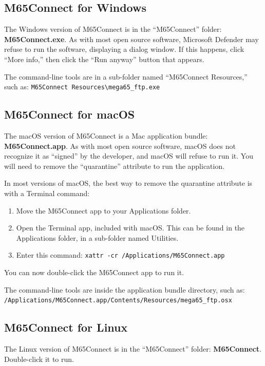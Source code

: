 \subsection{M65Connect for Windows}

The Windows version of M65Connect is in the ``M65Connect'' folder: {\bf M65Connect.exe}. As with most open source software, Microsoft Defender may refuse to run the software, displaying a dialog window. If this happens, click ``More info,'' then click the ``Run anyway'' button that appears.

The command-line tools are in a sub-folder named ``M65Connect Resources,'' such as: {\tt M65Connect Resources\textbackslash{}mega65\_ftp.exe}

\subsection{M65Connect for macOS}

The macOS version of M65Connect is a Mac application bundle: {\bf M65Connect.app}. As with most open source software, macOS does not recognize it as ``signed'' by the developer, and macOS will refuse to run it. You will need to remove the ``quarantine'' attribute to run the application.

In most versions of macOS, the best way to remove the quarantine attribute is with a Terminal command:

\begin{enumerate}
\item Move the M65Connect app to your Applications folder.
\item Open the Terminal app, included with macOS. This can be found in the Applications folder, in a sub-folder named Utilities.
\item Enter this command: {\tt xattr -cr /Applications/M65Connect.app}
\end{enumerate}

You can now double-click the M65Connect app to run it.

The command-line tools are inside the application bundle directory, such as: {\tt /Applications/M65Connect.app/Contents/Resources/mega65\_ftp.osx}

\subsection{M65Connect for Linux}

The Linux version of M65Connect is in the ``M65Connect'' folder: {\bf M65Connect}. Double-click it to run.


